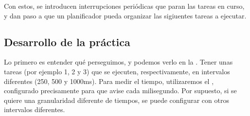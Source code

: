 \documentclass[../main.tex]{subfiles}
\begin{document}
        Con estos, se introducen interrupciones periódicas que paran las tareas en curso, y dan paso a que un planificador pueda organizar las sigiuentes tareas a ejecutar. 

        \subsection{Desarrollo de la práctica}

            Lo primero es entender qué perseguimos, y podemos verlo en la . Tener unas tareas (por ejemplo 1, 2 y 3) que se ejecuten, respectivamente, en intervalos diferentes (250, 500 y 1000ms). Para medir el tiempo, utilizaremos el , configurado precisamente para que avise cada milisegundo. Por supuesto, si se quiere una granularidad diferente de tiempos, se puede configurar con otros intervalos diferentes.
\end{document}

